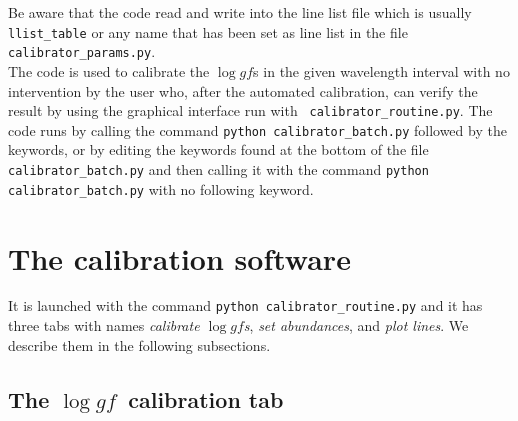 \documentclass[a4paper,10pt]{article}
\newcommand\loggf{$\log gf$}
\begin{document}
Be aware that the code read and write into the line list file which is
usually {\tt llist\_table} or any name that has been set as line list 
in the file {\tt calibrator\_params.py}.\\

The code is used to calibrate the \loggf s in the given wavelength interval
with no intervention by the user who, after the automated calibration, can
verify the result by using the graphical interface run with {\tt
calibrator\_routine.py}. The code runs by calling the command {\tt python
calibrator\_batch.py} followed by the keywords, or by editing the keywords
found at the bottom of the file {\tt calibrator\_batch.py} and then calling
it with the command {\tt python calibrator\_batch.py} with no following
keyword.


\section{The calibration software}\label{sec_calib_software}

It is launched with the command {\tt python calibrator\_routine.py} and
it has three tabs with names {\em calibrate \loggf s}, {\em set abundances},
and {\em plot lines}. We describe them in the following subsections.


\subsection{The \loggf\ calibration tab}\label{sec_calib_tab}
\end{document}
